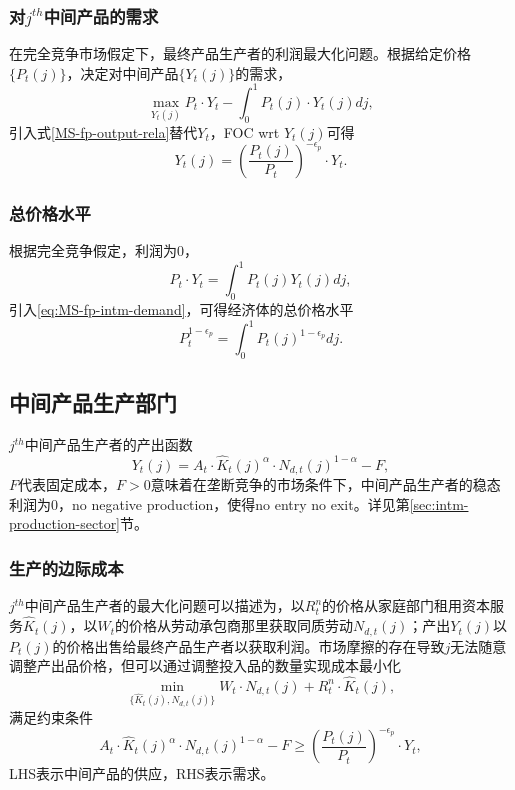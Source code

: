 \subsubsection{对$j^{th}$中间产品的需求}
在完全竞争市场假定下，最终产品生产者的利润最大化问题。根据给定价格$\{P_{t}(j)\}$，决定对中间产品$\{Y_t(j)\}$的需求，
\begin{equation*}
\max_{Y_t(j)} P_t \cdot Y_t - \int_{0}^{1} P_t(j) \cdot Y_t(j) dj,
\end{equation*}
引入式\eqref{MS-fp-output-rela}替代$Y_t$，FOC wrt $Y_t(j)$可得
\begin{equation}
\label{eq:MS-fp-intm-demand}
Y_t(j) = \left(\frac{P_t(j)}{P_t}\right)^{-\epsilon_p} \cdot Y_t.
\end{equation}

\subsubsection{总价格水平}
根据完全竞争假定，利润为$0$，
\begin{equation*}
P_t \cdot Y_t = \int_0^1 P_t(j) Y_t(j) dj,
\end{equation*}
引入\eqref{eq:MS-fp-intm-demand}，可得经济体的总价格水平
\begin{equation}
\label{eq:MS-fp-agg-price-index}
P_t^{1-\epsilon_p} = \int_{0}^{1} P_t(j)^{1-\epsilon_p} dj.
\end{equation}

\subsection{中间产品生产部门}
$j^{th}$中间产品生产者的产出函数
\begin{equation}
\label{eq:MS-intm-output-rela}
Y_t(j) = A_t \cdot \hat{K}_t(j)^{\alpha} \cdot N_{d,t}(j)^{1-\alpha} - F,
\end{equation}
$F$代表固定成本，$F>0$意味着在垄断竞争的市场条件下，中间产品生产者的稳态利润为0，no negative production，使得no entry no exit。详见第\ref{sec:intm-production-sector}节。

\subsubsection{生产的边际成本}
$j^{th}$中间产品生产者的最大化问题可以描述为，以$R^n_t$的价格从家庭部门租用资本服务$\hat{K}_t(j)$，以$W_t$的价格从劳动承包商那里获取同质劳动$N_{d,t}(j)$；产出$Y_t(j)$以$P_t(j)$的价格出售给最终产品生产者以获取利润。市场摩擦的存在导致$j$无法随意调整产出品价格，但可以通过调整投入品的数量实现成本最小化
\begin{equation*}
\min_{\{\hat{K}_t(j), N_{d,t}(j)\}} W_t \cdot N_{d,t}(j) + R^n_t \cdot \hat{K}_{t}(j),
\end{equation*}
满足约束条件
\begin{equation*}
A_t \cdot \hat{K}_t(j)^{\alpha} \cdot N_{d,t}(j)^{1-\alpha} - F \ge \left( \frac{P_{t}(j)}{P_t} \right)^{-\epsilon_p} \cdot Y_t,
\end{equation*}
LHS表示中间产品的供应，RHS表示需求。


